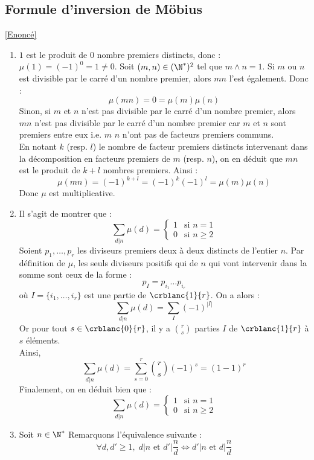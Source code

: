 \documentclass[8pt]{book}
\begin{document}
	\subsection{Formule d'inversion de Möbius}
	\label{Formule d'inversion de Möbius corrigé}
	\textcolor{blue}{\hyperref[Formule d'inversion de Möbius]{[Enoncé]}}\\
	\begin{enumerate}
		\item $1$ est le produit de $0$ nombre premiers distincts, donc : $\mu(1)=(-1)^0=1\ne 0$.
		Soit $(m,n)\in(\N^*)^2$ tel que $m\wedge n=1$.
		Si $m$ ou $n$ est divisible par le carré d'un nombre premier, alors $mn$ l'est également. Donc :\[\mu(mn)=0=\mu(m)\mu(n)\]
		Sinon, si $m$ et $n$ n'est pas divisible par le carré d'un nombre premier, alors $mn$ n'est pas divisible par le carré d'un nombre premier car $m$ et $n$ sont premiers entre eux i.e. $m$ $n$ n'ont pas de facteurs premiers communs.\\
		En notant $k$ (resp. $l$) le nombre de facteur premiers distincts intervenant dans la décomposition en facteurs premiers de $m$ (resp. $n$), on en déduit que $mn$ est le produit de $k+l$ nombres premiers.
		Ainsi : \[\mu(mn)=(-1)^{k+l}=(-1)^k(-1)^l=\mu(m)\mu(n)\]
		Donc $\mu$ est multiplicative.
		\item Il s'agit de montrer que : \[\sum_{d|n}\mu(d)=\begin{cases}
			1&\mbox{si }n=1\\
			0&\mbox{si }n\geq 2
		\end{cases}\]
		Soient $p_1,\dots,p_r$ les diviseurs premiers deux à deux distincts de l'entier $n$.
		Par définition de $\mu$, les seuls diviseurs positifs qui de $n$ qui vont intervenir dans la somme sont ceux de la forme :\[p_I=p_{i_1}\dots p_{i_r}\]
		où $I=\{i_1,\dots, i_r\}$ est une partie de $\crblanc{1}{r}$.
		On a alors :\[\sum_{d|n}\mu(d)=\sum_{I}(-1)^{|I|}\]
		Or pour tout $s\in\crblanc{0}{r}$, il y a $\displaystyle\binom{r}{s}$ parties $I$ de $\crblanc{1}{r}$ à $s$ éléments.\\
		Ainsi, \[\sum_{d|n}\mu(d)=\sum_{s=0}^{r}\binom{r}{s}(-1)^s=(1-1)^r\]
		Finalement, on en déduit bien que :
		\[\sum_{d|n}\mu(d)=\begin{cases}
			1 &\mbox{si }n=1\\
			0&\mbox{si }n\geq 2
		\end{cases}\]
		\item Soit $n\in\N^*$ 
		Remarquons l'équivalence suivante :
		\[\forall d,d'\geq 1, \; d|n \text{ et } d'|\frac{n}{d} \Longleftrightarrow d'|n \text{ et } d|\frac{n}{d}\]

\end{enumerate}
\end{document}
